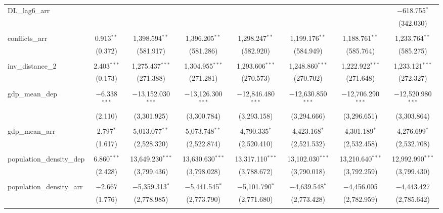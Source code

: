 \begin{table}[!htbp]
\begin{tabular}{@{\extracolsep{5pt}}lccccccc}
 DL\_lag6\_arr &  &  &  &  &  &  & $-$618.755$^{*}$ \\ 
  &  &  &  &  &  &  & (342.030) \\ 
  & & & & & & & \\ 
 conflicts\_arr & 0.913$^{**}$ & 1,398.594$^{**}$ & 1,396.205$^{**}$ & 1,298.247$^{**}$ & 1,199.176$^{**}$ & 1,188.761$^{**}$ & 1,233.764$^{**}$ \\ 
  & (0.372) & (581.917) & (581.286) & (582.920) & (584.949) & (585.764) & (585.275) \\ 
  & & & & & & & \\ 
 inv\_distance\_2 & 2.403$^{***}$ & 1,275.437$^{***}$ & 1,304.955$^{***}$ & 1,293.606$^{***}$ & 1,248.860$^{***}$ & 1,222.922$^{***}$ & 1,233.121$^{***}$ \\ 
  & (0.173) & (271.388) & (271.281) & (270.573) & (270.702) & (271.648) & (272.327) \\ 
  & & & & & & & \\ 
 gdp\_mean\_dep & $-$6.338$^{***}$ & $-$13,152.030$^{***}$ & $-$13,126.300$^{***}$ & $-$12,846.480$^{***}$ & $-$12,630.850$^{***}$ & $-$12,706.290$^{***}$ & $-$12,520.980$^{***}$ \\ 
  & (2.110) & (3,301.925) & (3,300.784) & (3,293.158) & (3,294.666) & (3,296.651) & (3,303.864) \\ 
  & & & & & & & \\ 
 gdp\_mean\_arr & 2.797$^{*}$ & 5,013.077$^{**}$ & 5,073.748$^{**}$ & 4,790.335$^{*}$ & 4,423.168$^{*}$ & 4,301.189$^{*}$ & 4,276.699$^{*}$ \\ 
  & (1.617) & (2,528.320) & (2,522.874) & (2,520.410) & (2,521.532) & (2,532.458) & (2,532.708) \\ 
  & & & & & & & \\ 
 population\_density\_dep & 6.860$^{***}$ & 13,649.230$^{***}$ & 13,630.630$^{***}$ & 13,317.110$^{***}$ & 13,102.030$^{***}$ & 13,210.640$^{***}$ & 12,992.990$^{***}$ \\ 
  & (2.428) & (3,799.436) & (3,798.028) & (3,788.672) & (3,790.018) & (3,792.259) & (3,799.430) \\ 
  & & & & & & & \\ 
 population\_density\_arr & $-$2.667 & $-$5,359.313$^{*}$ & $-$5,441.545$^{*}$ & $-$5,101.790$^{*}$ & $-$4,639.548$^{*}$ & $-$4,456.005 & $-$4,443.427 \\ 
  & (1.776) & (2,778.985) & (2,773.790) & (2,771.680) & (2,773.428) & (2,782.959) & (2,785.642) \\ 
  & & & & & & & \\ 

\end{tabular}
\end{table}
